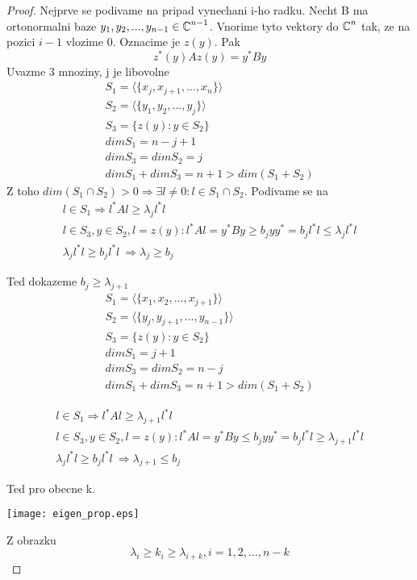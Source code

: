 \begin{proof}
	Nejprve se podivame na pripad vynechani i-ho radku.
	Necht B ma ortonormalni baze $y_1, y_2, ..., y_{n-1} \in \operatorname{\mathbb{C}}^{n - 1}$. Vnorime tyto vektory do $\operatorname{\mathbb{C}}^n$ tak, ze na pozici $i - 1$ vlozime 0.
	Oznacime je $z(y)$.
	Pak
	\[ z^{\ast}(y)Az(y) = y^{\ast}By \]
Uvazme 3 mnoziny, j je libovolne
	\begin{gather*}
		S_1 = \langle\{x_j, x_{j+1},..., x_n\} \rangle \\
		S_2 = \langle\{y_1, y_2,..., y_j\} \rangle \\
		S_3 = \{z(y): y \in S_2 \} \\
		dim S_1 = n - j + 1 \\
		dim S_3 = dim S_2 = j \\
		dim S_1 + dim S_3 = n+1 > dim (S_1 + S_2)
	\end{gather*}
	Z toho $dim(S_1 \cap S_2) > 0 \Rightarrow \exists l \ne 0 : l \in S_1 \cap S_2$.
	Podivame se na
	\begin{gather*}
		l \in S_1 \Rightarrow l^{\ast}Al \geq \lambda_j l^{\ast}l \\
		l \in S_3, y \in S_2, l = z(y): l^{\ast}Al = y^{\ast}By \geq b_j y y^{\ast} = b_j l^{\ast} l \leq \lambda_j l^{\ast}l \\
		\lambda_j l^{\ast}l \geq b_j l^{\ast}l\ \Rightarrow \lambda_j \geq b_j
	\end{gather*}

	Ted dokazeme $ b_j \geq \lambda_{j + 1} $
	\begin{gather*}
		S_1 = \langle\{x_1, x_2,..., x_{j+1}\} \rangle \\
		S_2 = \langle\{y_j, y_{j+1},..., y_{n-1}\} \rangle \\
		S_3 = \{z(y): y \in S_2 \} \\
		dim S_1 = j + 1 \\
		dim S_3 = dim S_2 = n - j \\
		dim S_1 + dim S_3 = n+1 > dim (S_1 + S_2)
	\end{gather*}

	\begin{gather*}
		l \in S_1 \Rightarrow l^{\ast}Al \geq \lambda_{j + 1} l^{\ast}l \\
		l \in S_3, y \in S_2, l = z(y): l^{\ast}Al = y^{\ast}By \leq b_j y y^{\ast} = b_j l^{\ast} l \geq \lambda_{j + 1} l^{\ast}l \\
		\lambda_j l^{\ast}l \geq b_j l^{\ast}l\ \Rightarrow \lambda_{j + 1} \leq b_j
	\end{gather*}

	Ted pro obecne k.

	\texttt{[image: eigen\_prop.eps]}

	Z obrazku
	\[ \lambda_i \geq k_i \geq \lambda_{i + k}, i = 1,2,..., n-k  \]

\end{proof}

